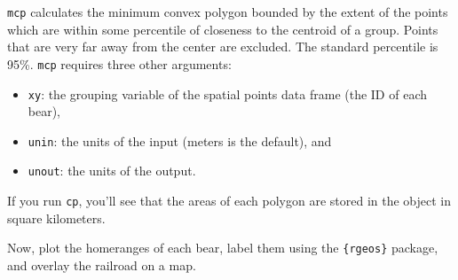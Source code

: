 \documentclass[]{book}
\newenvironment{Shaded}{\begin{snugshade}}{\end{snugshade}}
\newcommand{\KeywordTok}[1]{\textcolor[rgb]{0.13,0.29,0.53}{\textbf{#1}}}
\newcommand{\DataTypeTok}[1]{\textcolor[rgb]{0.13,0.29,0.53}{#1}}
\newcommand{\DecValTok}[1]{\textcolor[rgb]{0.00,0.00,0.81}{#1}}
\newcommand{\FloatTok}[1]{\textcolor[rgb]{0.00,0.00,0.81}{#1}}
\newcommand{\StringTok}[1]{\textcolor[rgb]{0.31,0.60,0.02}{#1}}
\newcommand{\CommentTok}[1]{\textcolor[rgb]{0.56,0.35,0.01}{\textit{#1}}}
\newcommand{\OperatorTok}[1]{\textcolor[rgb]{0.81,0.36,0.00}{\textbf{#1}}}
\newcommand{\NormalTok}[1]{#1}
\providecommand{\tightlist}{%
  \setlength{\itemsep}{0pt}\setlength{\parskip}{0pt}}
\theoremstyle{definition}
\theoremstyle{definition}
\theoremstyle{definition}
\theoremstyle{remark}
\begin{document}
\texttt{mcp} calculates the minimum convex polygon bounded by the extent
of the points which are within some percentile of closeness to the
centroid of a group. Points that are very far away from the center are
excluded. The standard percentile is 95\%. \texttt{mcp} requires three
other arguments:

\begin{itemize}
\tightlist
\item
  \texttt{xy}: the grouping variable of the spatial points data frame
  (the ID of each bear),
\item
  \texttt{unin}: the units of the input (meters is the default), and
\item
  \texttt{unout}: the units of the output.
\end{itemize}

If you run \texttt{cp}, you'll see that the areas of each polygon are
stored in the object in square kilometers.

Now, plot the homeranges of each bear, label them using the
\texttt{\{rgeos\}} package, and overlay the railroad on a map.

\begin{Shaded}
\end{Shaded}
\end{document}
